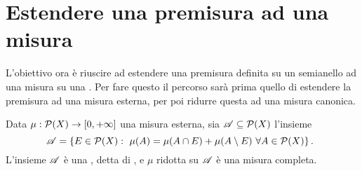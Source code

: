 \section{Estendere una premisura ad una misura}
L'obiettivo ora è riuscire ad estendere una premisura definita su un semianello ad una misura su una \sigalg{}. Per fare questo il percorso sarà prima quello di estendere la premisura ad una misura esterna, per poi ridurre questa ad una misura canonica.


\begin{theorem}\label{thm:RiduzionePreCaratheodory}
	Data $\mu:\mathcal P(X)\to [0,+\infty]$ una misura esterna, sia $\mathscr A\subseteq \mathcal P(X)$ l'insieme
	\begin{equation*}
		\mathscr A=\{E\in\mathcal P(X):\ \mu(A)=\mu(A\cap E)+\mu(A\setminus E)\ \forall A\in \mathcal P(X)\} \, \text{. }
	\end{equation*}
	L'insieme $\mathscr A$ è una \sigalg{}, detta \sigalg{} di \carat{}, e $\mu$ ridotta su $\mathscr A$ è una misura completa.
\end{theorem}
